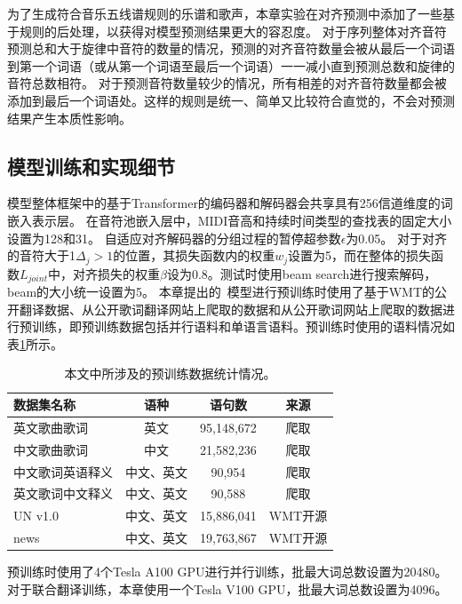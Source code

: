 为了生成符合音乐五线谱规则的乐谱和歌声，本章实验在对齐预测中添加了一些基于规则的后处理，以获得对模型预测结果更大的容忍度。
对于序列整体对齐音符预测总和大于旋律中音符的数量的情况，预测的对齐音符数量会被从最后一个词语到第一个词语（或从第一个词语至最后一个词语）一一减小直到预测总数和旋律的音符总数相符。
对于预测音符数量较少的情况，所有相差的对齐音符数量都会被添加到最后一个词语处。这样的规则是统一、简单又比较符合直觉的，不会对预测结果产生本质性影响。
\subsection{模型训练和实现细节}
模型整体框架中的基于Transformer的编码器和解码器会共享具有256信道维度的词嵌入表示层。
在音符池嵌入层中，MIDI音高和持续时间类型的查找表的固定大小设置为128和31。
自适应对齐解码器的分组过程的暂停超参数$\epsilon$为0.05。
对于对齐的音符大于1$\Delta_j>1$的位置，其损失函数内的权重$w_j$设置为5，而在整体的损失函数$L_{joint}$中，对齐损失的权重$\beta$设为0.8。测试时使用beam search进行搜索解码，beam的大小统一设置为5。
本章提出的\modelname~模型进行预训练时使用了基于WMT的公开翻译数据、从公开歌词翻译网站上爬取的数据和从公开歌词网站上爬取的数据进行预训练，即预训练数据包括并行语料和单语言语料。预训练时使用的语料情况如表\ref{tab:pretrain_data}所示。
\begin{table}[htbp]
    \centering
    \setlength{\belowcaptionskip}{8pt} %
    \caption{本文中所涉及的预训练数据统计情况。}
    \begin{tabular}{|l|c|c|c|}
    \hline
     数据集名称 & 语种 & 语句数 & 来源\\
    \hline
     英文歌曲歌词 & 英文 & 95,148,672 & 爬取 \\
    \hline
     中文歌曲歌词 & 中文 & 21,582,236 & 爬取 \\
    \hline
     中文歌词英语释义 & 中文、英文 & 90,954 & 爬取 \\
    \hline
     英文歌词中文释义 & 中文、英文 & 90,588 & 爬取 \\
    \hline
     UN v1.0 & 中文、英文 & 15,886,041 & WMT开源\\
    \hline
     news & 中文、英文 & 19,763,867 & WMT开源\\
    \hline
    \end{tabular}
    \label{tab:pretrain_data}
\end{table}
预训练时使用了4个Tesla A100 GPU进行并行训练，批最大词总数设置为20480。
对于联合翻译训练，本章使用一个Tesla V100 GPU，批最大词总数设置为4096。

